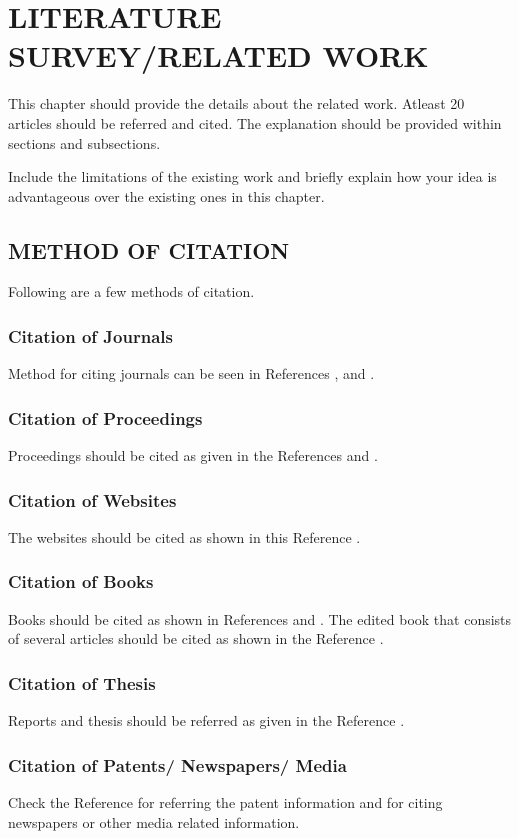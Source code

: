 
\chapter{\uppercase{Literature Survey/Related Work}} %
\label{ch:survey} %

This chapter should provide the details about the related work. Atleast 20 articles should be referred and cited. The explanation should be provided within sections and subsections. 

Include the limitations of the existing work and briefly explain how your idea is advantageous over the existing ones in this chapter.
\section{\uppercase{Method of Citation}}
Following are a few methods of citation.
\subsection{Citation of Journals}
 Method for citing journals can be seen in References \cite{factors}, \cite{conley} and \cite{waldron}.
\subsection{Citation of Proceedings}
Proceedings should be cited as given in the References \cite{strips} and \cite{fan}.
\subsection{Citation of Websites}
The websites should be cited as shown in this Reference \cite{regulations}.\\

\subsection{Citation of Books}
Books should be cited as shown in References \cite{holt} and \cite{Aghion}. The edited book that consists of several articles should be cited as shown in the Reference \cite{riley}.
\subsection{Citation of Thesis}
Reports and thesis should be referred as given in the Reference \cite{thesis}.
\subsection{Citation of Patents/ Newspapers/ Media}
Check the Reference \cite{patent} for referring the patent information and \cite{newspaper} for citing newspapers or other media related information.


